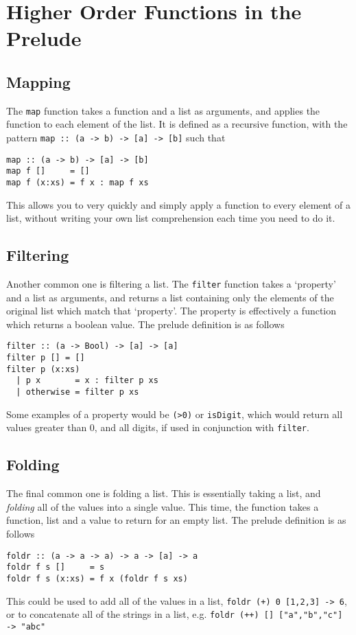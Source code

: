 \section*{Higher Order Functions in the Prelude}

\subsection*{Mapping}

The \verb`map` function takes a function and a list as arguments, and applies the function to each element of the list.
 It is defined as a recursive function, with the pattern \verb`map :: (a -> b) -> [a] -> [b]` such that
\begin{verbatim}
map :: (a -> b) -> [a] -> [b]
map f []     = []
map f (x:xs) = f x : map f xs
\end{verbatim}
This allows you to very quickly and simply apply a function to every element of a list, without writing your own list
 comprehension each time you need to do it.

\subsection*{Filtering}

Another common one is filtering a list. The \verb`filter` function takes a `property' and a list as arguments, and
 returns a list containing only the elements of the original list which match that `property'. The property is
 effectively a function which returns a boolean value. The prelude definition is as follows
\begin{verbatim}
filter :: (a -> Bool) -> [a] -> [a]
filter p [] = []
filter p (x:xs)
  | p x       = x : filter p xs
  | otherwise = filter p xs
\end{verbatim}
Some examples of a property would be \verb`(>0)` or \verb`isDigit`, which would return all values greater than 0, and
 all digits, if used in conjunction with \verb`filter`.

\subsection*{Folding}

The final common one is folding a list. This is essentially taking a list, and \textit{folding} all of the values into a
 single value. This time, the function takes a function, list and a value to return for an empty list. The prelude
 definition is as follows
\begin{verbatim}
foldr :: (a -> a -> a) -> a -> [a] -> a
foldr f s []     = s
foldr f s (x:xs) = f x (foldr f s xs)
\end{verbatim}
This could be used to add all of the values in a list, \verb`foldr (+) 0 [1,2,3] -> 6`, or to concatenate all of the
 strings in a list, e.g. \verb`foldr (++) [] ["a","b","c"] -> "abc"`